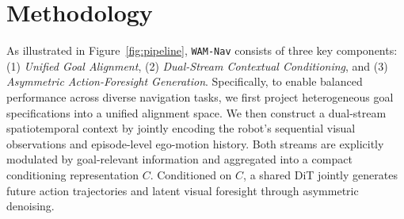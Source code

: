 \documentclass{article}
\begin{document}
%
\section{Methodology}
\label{sec:method}
As illustrated in Figure~\ref{fig:pipeline}, \texttt{WAM-Nav} consists of three key components: (1) \textit{Unified Goal Alignment}, (2) \textit{Dual-Stream Contextual Conditioning}, and (3) \textit{Asymmetric Action-Foresight Generation}. Specifically, to enable balanced performance across diverse navigation tasks, we first project heterogeneous goal specifications into a unified alignment space. We then construct a dual-stream spatiotemporal context by jointly encoding the robot’s sequential visual observations and episode-level ego-motion history. Both streams are explicitly modulated by goal-relevant information and aggregated into a compact conditioning representation $C$. Conditioned on $C$, a shared DiT jointly generates future action trajectories and latent visual foresight through asymmetric denoising.
\end{document}
